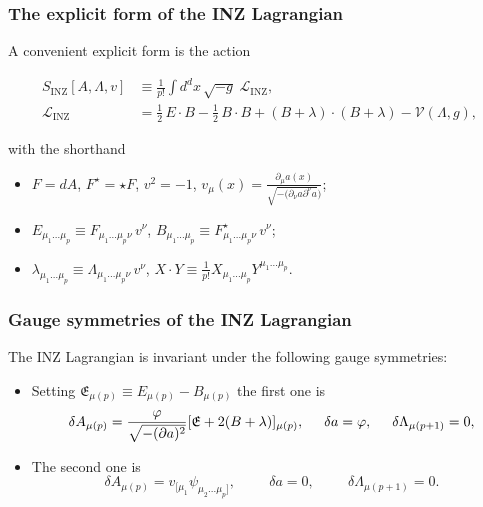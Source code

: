 \documentclass{beamer}
\begin{document}
\begin{frame}
\frametitle{The explicit form of the INZ Lagrangian}

    \small
    A convenient explicit form is the action

    \[\begin{aligned}
    S_{\text{INZ}}[A,\Lambda,v]
    &\equiv \frac{1}{p!}\int d^{d}x\,\sqrt{-g}\;\mathcal{L}_{\text{INZ}},\\[2pt]
    \mathcal{L}_{\text{INZ}}
    &=\frac{1}{2}\,E\cdot B-\frac{1}{2}\,B\cdot B+(B+\lambda)\cdot(B+\lambda)
      -\mathcal{V}(\Lambda,g),
    \end{aligned}\]

    with the shorthand
    \begin{itemize}
        \item $F=dA$, \; $F^{\star}=\star F$, \; $v^2=-1$, \; $v_{\mu}(x)=\frac{\partial_{\mu}a(x)}{\sqrt{-(\partial_{\nu}a\partial^{\nu}a})}$;
        \item $E_{\mu_1\dots\mu_p}\equiv F_{\mu_1\dots\mu_p\nu}\,v^{\nu}$, \; $B_{\mu_1\dots\mu_p}\equiv F^{\star}_{\mu_1\dots\mu_p\nu}\,v^{\nu}$;
        \item $\lambda_{\mu_1\dots\mu_p}\equiv \Lambda_{\mu_1\dots\mu_p\nu}\,v^{\nu}$, \; $X\cdot Y\equiv \frac{1}{p!}X_{\mu_1\dots\mu_p}Y^{\mu_1\dots\mu_p}$.
    \end{itemize}

\end{frame}

\begin{frame}
\frametitle{Gauge symmetries of the INZ Lagrangian}

    The INZ Lagrangian is invariant under the following gauge symmetries:

    \vspace{0.2cm}

    \begin{itemize}
        \item Setting $\mathfrak{E}_{\mu(p)}\equiv E_{\mu(p)}-B_{\mu(p)}$ the first one is
        \[\delta A_{\mu(p)}=\frac{\varphi}{\sqrt{-(\partial a)^2}}[\mathfrak{E}+2(B+\lambda)]_{\mu(p)},\hspace{0.5cm}\delta a=\varphi,\hspace{0.5cm}\delta\Lambda_{\mu(p+1)}=0,\]
        \item The second one is 
        \[\delta A_{\mu(p)}=v_{[\mu_1}\psi_{\mu_2...\mu_p]},\hspace{1cm}\delta a=0,\hspace{1cm}\delta\Lambda_{\mu(p+1)}=0.\]
    \end{itemize}

    
\end{frame}
\end{document}
